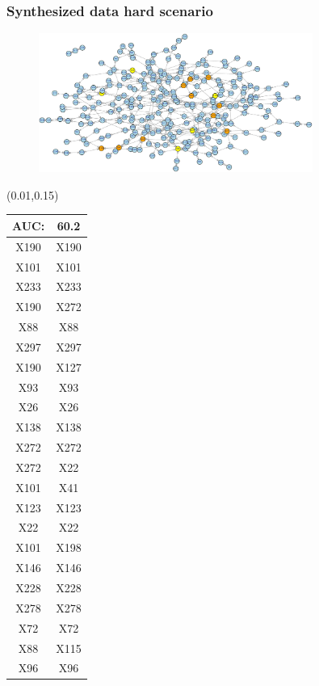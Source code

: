 \documentclass{beamer}
\newcommand{\boz}{\cellcolor{pathwaynode}}
\newcommand{\ghool}{\cellcolor{independentnode}}
\begin{document}
\begin{frame}[plain]
  \frametitle{Synthesized data hard scenario}
  \begin{figure}
    \includegraphics[width=0.8\textwidth]{synthesized-hard}
  \end{figure}
  \begin{textblock*}{\paperwidth}(0.01\textwidth,0.15\textheight)
    \raggedright 
    \tiny
    \begin{tabular}{| c c |}
      \hline
AUC: & 60.2 \\ \hline \hline
\boz X190   &  \boz X190  \\ \hline
X101   &  X101  \\ \hline
X233   &  X233  \\ \hline
\boz X190   &  \boz X272  \\ \hline
\ghool X88   &  \ghool X88  \\ \hline
X297   &  X297  \\ \hline
\boz X190   &  X127  \\ \hline
X93   &  X93  \\ \hline
X26   &  X26  \\ \hline
\boz X138   &  \boz X138  \\ \hline
\boz X272   &  \boz X272  \\ \hline
\boz X272   &  \boz X22  \\ \hline
X101   &  X41  \\ \hline
X123   &  X123  \\ \hline
\boz X22   &  \boz X22  \\ \hline
X101   &  X198  \\ \hline
X146   &  X146  \\ \hline
\boz X228   &  \boz X228  \\ \hline
X278   &  X278  \\ \hline
X72   &  X72  \\ \hline
\ghool X88   &  X115  \\ \hline
\ghool X96   &  \ghool X96  \\ \hline

\end{tabular}
\end{textblock*}
\end{frame}
\end{document}
